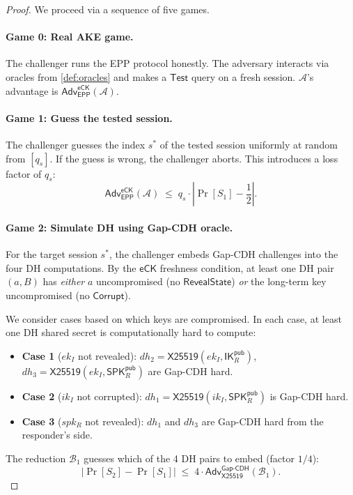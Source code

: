 \documentclass[11pt,a4paper]{article}
\theoremstyle{definition}
\theoremstyle{remark}
\newcommand{\adv}{\mathsf{Adv}}
\newcommand{\advA}{\mathcal{A}}
\newcommand{\advB}{\mathcal{B}}
\renewcommand{\DH}{\mathsf{X25519}}
\newcommand{\GapCDH}{\mathsf{Gap\text{-}CDH}}
\newcommand{\eCK}{\mathsf{eCK}}
\newcommand{\IK}{\mathsf{IK}}
\newcommand{\SPK}{\mathsf{SPK}}
\begin{document}
\begin{proof}
We proceed via a sequence of five games.

\paragraph{Game 0: Real AKE game.}
The challenger runs the EPP protocol honestly.  The adversary interacts via
oracles from \cref{def:oracles} and makes a $\mathsf{Test}$ query on a fresh
session.  $\advA$'s advantage is $\adv^{\eCK}_{\mathsf{EPP}}(\advA)$.

\paragraph{Game 1: Guess the tested session.}
The challenger guesses the index $s^*$ of the tested session uniformly at
random from $[q_s]$.  If the guess is wrong, the challenger aborts.
This introduces a loss factor of $q_s$:
\[
  \adv^{\eCK}_{\mathsf{EPP}}(\advA)
  \;\leq\; q_s \cdot \left|\Pr[S_1] - \frac{1}{2}\right|.
\]

\paragraph{Game 2: Simulate DH using Gap-CDH oracle.}
For the target session $s^*$, the challenger embeds Gap-CDH challenges into
the four DH computations.  By the $\eCK$ freshness condition, at least one
DH pair $(a, B)$ has \emph{either} $a$ uncompromised (no $\mathsf{RevealState}$)
\emph{or} the long-term key uncompromised (no $\mathsf{Corrupt}$).

We consider cases based on which keys are compromised.  In each case, at
least one DH shared secret is computationally hard to compute:
\begin{itemize}[nosep]
  \item \textbf{Case 1} ($ek_I$ not revealed): $\mathit{dh}_2 = \DH(ek_I, \IK_R^{\mathsf{pub}})$,
        $\mathit{dh}_3 = \DH(ek_I, \SPK_R^{\mathsf{pub}})$ are Gap-CDH hard.
  \item \textbf{Case 2} ($ik_I$ not corrupted): $\mathit{dh}_1 = \DH(ik_I, \SPK_R^{\mathsf{pub}})$ is Gap-CDH hard.
  \item \textbf{Case 3} ($spk_R$ not revealed): $\mathit{dh}_1$ and $\mathit{dh}_3$
        are Gap-CDH hard from the responder's side.
\end{itemize}

The reduction $\advB_1$ guesses which of the 4 DH pairs to embed (factor $1/4$):
\[
  |\Pr[S_2] - \Pr[S_1]| \;\leq\; 4 \cdot \adv^{\GapCDH}_{\DH}(\advB_1).
\]


\end{proof}
\end{document}
